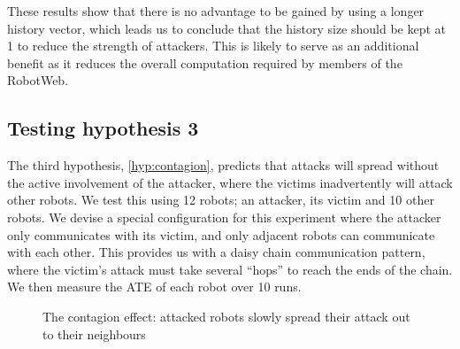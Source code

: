 These results show that there is no advantage to be gained by using a longer history vector, which leads us to conclude that the history size should be kept at 1 to reduce the strength of attackers. This is likely to serve as an additional benefit as it reduces the overall computation required by members of the RobotWeb.

\subsection{Testing hypothesis 3}
The third hypothesis, \ref{hyp:contagion}, predicts that attacks will spread without the active involvement of the attacker, where the victims inadvertently will attack other robots. We test this using 12 robots; an attacker, its victim and 10 other robots. We devise a special configuration for this experiment where the attacker only communicates with its victim, and only adjacent robots can communicate with each other. This provides us with a daisy chain communication pattern, where the victim's attack must take several ``hops'' to reach the ends of the chain. We then measure the ATE of each robot over 10 runs. 

\begin{figure}[!h]
	\centering
	\caption{The contagion effect: attacked robots slowly spread their attack out to their neighbours}
	\label{fig:contagion}
\end{figure}

